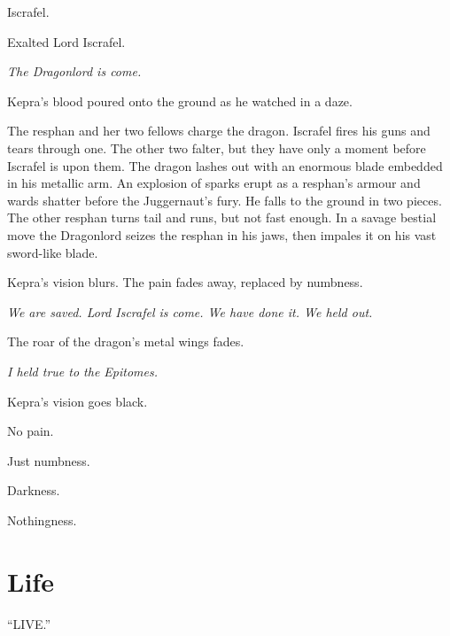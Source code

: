 \documentclass
  [a4paper,
   12pt,
   oneside
  ]%
  {article}
\begin{document}
Iscrafel. 

Exalted Lord Iscrafel. 

\emph{The Dragonlord is come.}

Kepra’s blood poured onto the ground as he watched in a daze.
% 
% 

The resphan and her two fellows charge the dragon. 
Iscrafel fires his guns and tears through one. 
The other two falter, but they have only a moment before Iscrafel is upon them. 
The dragon lashes out with an enormous blade embedded in his metallic arm. 
An explosion of sparks erupt as a resphan’s armour and wards shatter before the Juggernaut’s fury. 
He falls to the ground in two pieces. 
The other resphan turns tail and runs, but not fast enough. 
In a savage bestial move the Dragonlord seizes the resphan in his jaws, then impales it on his vast sword-like blade. 

Kepra’s vision blurs. 
The pain fades away, replaced by numbness.

\emph{We are saved. Lord Iscrafel is come. We have done it. We held out.}

The roar of the dragon’s metal wings fades. 

\emph{I held true to the Epitomes.}

Kepra’s vision goes black. 

No pain. 

Just numbness. 

Darkness.

Nothingness.



\section{Life}
{\Large{``{LIVE.}''}}
\end{document}
